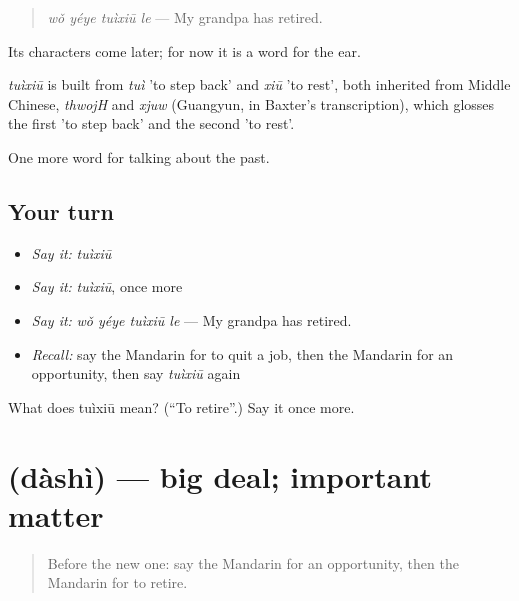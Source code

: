 \begin{quote}
\emph{wǒ yéye tuìxiū le} — My grandpa has retired.
\end{quote}

Its characters come later; for now it is a word for the ear.

\begin{cousinweb}
\emph{tuìxiū} is built from \emph{tuì} 'to step back' and \emph{xiū} 'to rest', both inherited from Middle Chinese, \emph{thwojH} and \emph{xjuw} (Guangyun, in Baxter's transcription), which glosses the first 'to step back' and the second 'to rest'.
\end{cousinweb}

\begin{grammarlens}[title={What you've built}]
One more word for talking about the past.
\end{grammarlens}

\subsection*{Your turn}
\begin{itemize}
\raggedright
  \item \emph{Say it:} \emph{tuìxiū}
  \item \emph{Say it:} \emph{tuìxiū}, once more
  \item \emph{Say it:} \emph{wǒ yéye tuìxiū le} — My grandpa has retired.
  \item \emph{Recall:} say the Mandarin for to quit a job, then the Mandarin for an opportunity, then say \emph{tuìxiū} again
\end{itemize}

\begin{tcolorbox}[breakable,colback=teal!4,colframe=teal!35!black,title={Before you move on}]
What does tuìxiū mean? (\textquotedblleft{}To retire\textquotedblright{}.) Say it once more.
\end{tcolorbox}
\section[\texorpdfstring{\zh{大事} (dàshì)}{大事 (dàshì)}]{ (dàshì) — big deal; important matter}

\label{lesson:ZH-C276-dashi}



\begin{quote}
Before the new one: say the Mandarin for an opportunity, then the Mandarin for to retire.
\end{quote}

